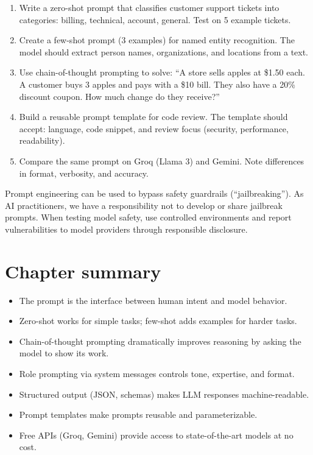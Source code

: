 \begin{exercise}
\begin{enumerate}
  \item Write a zero-shot prompt that classifies customer support tickets into categories: billing, technical, account, general. Test on 5 example tickets.
  \item Create a few-shot prompt (3 examples) for named entity recognition. The model should extract person names, organizations, and locations from a text.
  \item Use chain-of-thought prompting to solve: ``A store sells apples at \$1.50 each. A customer buys 3 apples and pays with a \$10 bill. They also have a 20\% discount coupon. How much change do they receive?''
  \item Build a reusable prompt template for code review. The template should accept: language, code snippet, and review focus (security, performance, readability).
  \item Compare the same prompt on Groq (Llama 3) and Gemini. Note differences in format, verbosity, and accuracy.
\end{enumerate}
\end{exercise}

\begin{ethicsbox}
Prompt engineering can be used to bypass safety guardrails (``jailbreaking''). As AI practitioners, we have a responsibility not to develop or share jailbreak prompts. When testing model safety, use controlled environments and report vulnerabilities to model providers through responsible disclosure.
\end{ethicsbox}

\section{Chapter summary}

\begin{itemize}
  \item The prompt is the interface between human intent and model behavior.
  \item Zero-shot works for simple tasks; few-shot adds examples for harder tasks.
  \item Chain-of-thought prompting dramatically improves reasoning by asking the model to show its work.
  \item Role prompting via system messages controls tone, expertise, and format.
  \item Structured output (JSON, schemas) makes LLM responses machine-readable.
  \item Prompt templates make prompts reusable and parameterizable.
  \item Free APIs (Groq, Gemini) provide access to state-of-the-art models at no cost.
\end{itemize}
